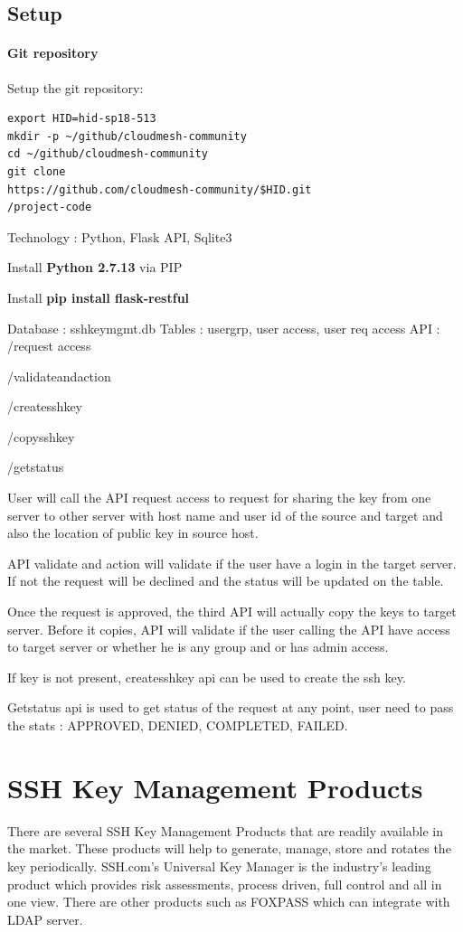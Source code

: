 \subsection{Setup}
\paragraph{Git repository}
Setup the git repository:
\begin{verbatim}
export HID=hid-sp18-513 
mkdir -p ~/github/cloudmesh-community
cd ~/github/cloudmesh-community 
git clone
https://github.com/cloudmesh-community/$HID.git
/project-code
\end{verbatim}

Technology : Python, Flask API, Sqlite3

Install \textbf{Python 2.7.13} via PIP

Install \textbf{pip install flask-restful} 

Database : sshkeymgmt.db 
Tables : usergrp, user access, user req access 
API : 
    /request access

    /validateandaction

    /createsshkey

    /copysshkey

    /getstatus

User will call the API request access to request for sharing the key
from one server to other server with host name and user id of the 
source and target and also the location of public key in source host.

API validate and action will validate if the user have a login in the
target server. If not the request will be declined and the status will be
updated on the table.

Once the request is approved, the third API will actually copy the keys
to target server. Before it copies, API will validate if the user calling the
API have access to target server or whether he is any group and or has
admin access. 

If key is not present, createsshkey api can be used to create the ssh key.

Getstatus api is used to get status of the request at any point, user need
to pass the stats : APPROVED, DENIED, COMPLETED, FAILED.

\section{SSH Key Management Products}
There are several SSH Key Management Products that are readily available
in the market. These products will help to generate, manage, store and
rotates the key periodically. SSH.com's Universal Key Manager is the
industry's leading product which provides risk assessments, process driven,
full control and all in one view. There are other products such as 
FOXPASS which can integrate with LDAP server.

